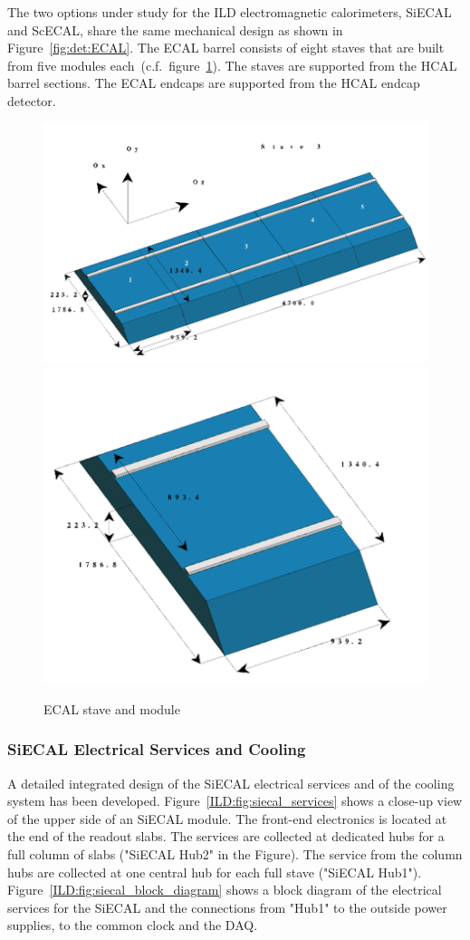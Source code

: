 The two options under study for the ILD electromagnetic calorimeters, SiECAL and ScECAL, share the same mechanical design as shown in Figure~\ref{fig:det:ECAL}. The ECAL barrel consists of eight staves that are built from five modules each~(c.f.~figure~\ref{ILD:fig:ECAL_Mechanics}). The staves are supported from the HCAL barrel sections. The ECAL endcaps are supported from the HCAL endcap detector.
\begin{figure}[h]
    \centering
        \includegraphics[width=0.5\hsize]{Integration/fig/ECAL_Stave.png}
        \includegraphics[width=0.3\hsize]{Integration/fig/ECAL_Module.png}
    \caption{ECAL stave and module~\cite{ild:bib:SiECAL_ICD}}
    \label{ILD:fig:ECAL_Mechanics}
\end{figure}

\subsubsection{SiECAL Electrical Services and Cooling}

A detailed integrated design of the SiECAL electrical services and of the cooling system has been developed. Figure~\ref{ILD:fig:siecal_services} shows a close-up view of the upper side of an SiECAL module. The front-end electronics is located at the end of the readout slabs. The services are collected at dedicated hubs for a full column of slabs ("SiECAL Hub2" in the Figure). The service from the column hubs are collected at one central hub for each full stave ("SiECAL Hub1"). Figure~\ref{ILD:fig:siecal_block_diagram} shows a block diagram of the electrical services for the SiECAL and the connections from "Hub1" to the outside power supplies, to the common clock and the DAQ. 

